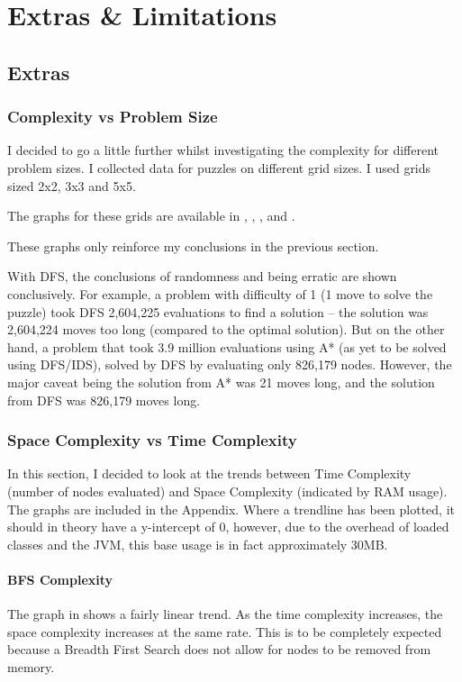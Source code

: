\documentclass[a4paper]{article}
\begin{document}
\section{Extras \& Limitations}

\subsection{Extras}
\subsubsection{Complexity vs Problem Size}
I decided to go a little further whilst investigating the complexity for different problem sizes.
I collected data for puzzles on different grid sizes.
I used grids sized 2x2, 3x3 and 5x5.

The graphs for these grids are available in , , , and .

These graphs only reinforce my conclusions in the previous section.

With DFS, the conclusions of randomness and being erratic are shown conclusively.
For example, a problem with difficulty of 1 (1 move to solve the puzzle) took DFS 2,604,225 evaluations to find a solution -- the solution was 2,604,224 moves too long (compared to the optimal solution).
But on the other hand, a problem that took 3.9 million evaluations using A* (as yet to be solved using DFS/IDS), solved by DFS by evaluating only 826,179 nodes.
However, the major caveat being the solution from A* was 21 moves long, and the solution from DFS was 826,179 moves long.

\subsubsection{Space Complexity vs Time Complexity}
In this section, I decided to look at the trends between Time Complexity (number of nodes evaluated) and Space Complexity (indicated by RAM usage).
The graphs are included in the Appendix.
Where a trendline has been plotted, it should in theory have a y-intercept of 0, however, due to the overhead of loaded classes and the JVM, this base usage is in fact approximately 30MB.

\paragraph{BFS Complexity}
The graph in  shows a fairly linear trend.
As the time complexity increases, the space complexity increases at the same rate.
This is to be completely expected because a Breadth First Search does not allow for nodes to be removed from memory.
\end{document}
